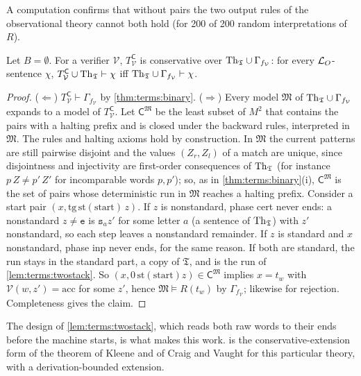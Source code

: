 A computation confirms that without pairs the two output rules of the observational theory cannot both hold (for 200 of 200 random interpretations of $R$).

\begin{proposition}\label{prop:terms:conservativity}
Let $B=\emptyset$. For a verifier $\mathcal V$, $T^{\mathsf C}_{\mathcal V}$ is conservative over $\mathrm{Th}_{\mathfrak{T}}\cup\Gamma_{f_{\mathcal V}}$: for every $\mathcal{L}_{O}$-sentence $\chi$, $T^{\mathsf C}_{\mathcal V}\cup\mathrm{Th}_{\mathfrak{T}}\vdash\chi$ iff $\mathrm{Th}_{\mathfrak{T}}\cup\Gamma_{f_{\mathcal V}}\vdash\chi$.
\end{proposition}

\begin{proof}
($\Leftarrow$) $T^{\mathsf C}_{\mathcal V}\vdash\Gamma_{f_{\mathcal V}}$ by \cref{thm:terms:binary}. ($\Rightarrow$) Every model $\mathfrak M$ of $\mathrm{Th}_{\mathfrak{T}}\cup\Gamma_{f_{\mathcal V}}$ expands to a model of $T^{\mathsf C}_{\mathcal V}$. Let $\mathsf C^{\mathfrak M}$ be the least subset of $M^2$ that contains the pairs with a halting prefix and is closed under the backward rules, interpreted in $\mathfrak M$. The rules and halting axioms hold by construction. In $\mathfrak M$ the current patterns are still pairwise disjoint and the values $(Z_r,Z_l)$ of a match are unique, since disjointness and injectivity are first-order consequences of $\mathrm{Th}_{\mathfrak{T}}$ (for instance $p\,Z\ne p'\,Z'$ for incomparable words $p,p'$); so, as in \cref{thm:terms:binary}(i), $\mathsf C^{\mathfrak M}$ is the set of pairs whose deterministic run in $\mathfrak M$ reaches a halting prefix. Consider a start pair $(x,\mathrm{tg}\,\mathrm{st}(\mathrm{start})\,z)$. If $z$ is nonstandard, phase cert never ends: a nonstandard $z\ne\mathtt e$ is $\mathtt s_az'$ for some letter $a$ (a sentence of $\mathrm{Th}_{\mathfrak{T}}$) with $z'$ nonstandard, so each step leaves a nonstandard remainder. If $z$ is standard and $x$ nonstandard, phase inp never ends, for the same reason. If both are standard, the run stays in the standard part, a copy of $\mathfrak T$, and is the run of \cref{lem:terms:twostack}. So $(x,0\,\mathrm{st}(\mathrm{start})z)\in\mathsf C^{\mathfrak M}$ implies $x=t_w$ with $\mathcal V(w,z')=\mathrm{acc}$ for some $z'$, hence $\mathfrak M\models R(t_w)$ by $\Gamma_{f_{\mathcal V}}$; likewise for rejection. Completeness gives the claim.
\end{proof}

The design of \cref{lem:terms:twostack}, which reads both raw words to their ends before the machine starts, is what makes this work.  is the conservative-extension form of the theorem of Kleene and of Craig and Vaught for this particular theory, with a derivation-bounded extension.

